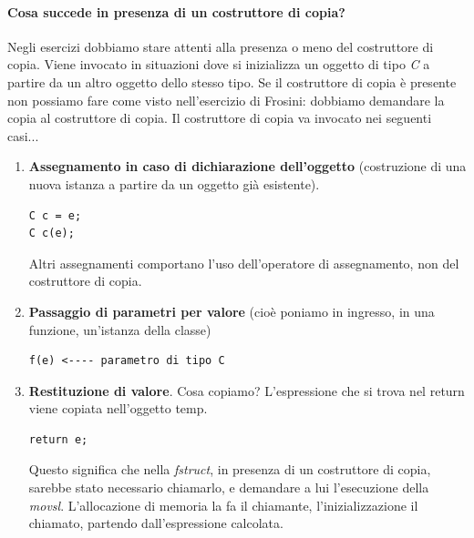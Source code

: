 \documentclass[11pt]{report}
\theoremstyle{definition}
\begin{document}
\paragraph{Cosa succede in presenza di un costruttore di copia?} Negli esercizi dobbiamo stare attenti alla presenza o meno del costruttore di copia. Viene invocato in situazioni dove si inizializza un oggetto di tipo \emph{C} a partire da un altro oggetto dello stesso tipo. Se il costruttore di copia è presente non possiamo fare come visto nell'esercizio di Frosini: dobbiamo demandare la copia al costruttore di copia. Il costruttore di copia va invocato nei seguenti casi...
\begin{enumerate}
\item \textbf{Assegnamento in caso di dichiarazione dell'oggetto} (costruzione di una nuova istanza a partire da un oggetto già esistente). 
\begin{verbatim}
C c = e;
C c(e);
\end{verbatim}
Altri assegnamenti comportano l'uso dell'operatore di assegnamento, non del costruttore di copia.
\item \textbf{Passaggio di parametri per valore} (cioè poniamo in ingresso, in una funzione, un'istanza della classe)
\begin{verbatim}
f(e) <---- parametro di tipo C
\end{verbatim}
\item \textbf{Restituzione di valore}. Cosa copiamo? L'espressione che si trova nel return viene copiata nell'oggetto temp. 
\begin{verbatim}
return e;
\end{verbatim}
Questo significa che nella \emph{fstruct}, in presenza di un costruttore di copia, sarebbe stato necessario chiamarlo, e demandare a lui l'esecuzione della \emph{movsl}. L'allocazione di memoria la fa il chiamante, l'inizializzazione il chiamato, partendo dall'espressione calcolata.
\end{enumerate}
\end{document}

